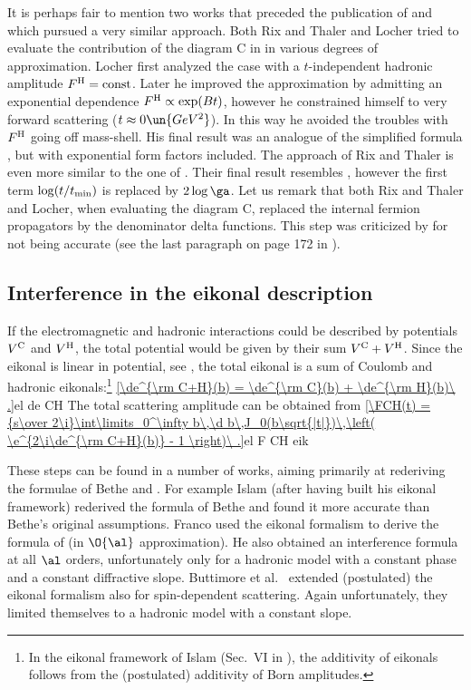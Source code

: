 It is perhaps fair to mention two works that preceded the publication of \WaY{}  and which pursued a very similar approach. Both Rix and Thaler  and Locher  tried to evaluate the contribution of the diagram C in  in various degrees of approximation. Locher first analyzed the case with a $t$-independent hadronic amplitude $F^{\rm H}=\hbox{const}$. Later he improved the approximation by admitting an exponential dependence $F^{\rm H} \propto \exp(Bt)$, however he constrained himself to very forward scattering ($t\approx 0\un{GeV^2}$). In this way he avoided the troubles with $F^{\rm H}$ going off mass-shell. His final result was an analogue of the simplified \WaY{} formula , but with exponential form factors included. The approach of Rix and Thaler is even more similar to the one of \WaY. Their final result resembles , however the first term $\log(t/t_{\rm min})$ is replaced by $2\log\ga$. Let us remark that both Rix and Thaler and Locher, when evaluating the diagram C, replaced the internal fermion propagators by the denominator delta functions. This step was criticized by \WaY{} for not being accurate (see the last paragraph on page 172 in ).



\subsection[int eik]{Interference in the eikonal description}

If the electromagnetic and hadronic interactions could be described by potentials $V^{\rm C}$ and $V^{\rm H}$, the total potential would be given by their sum $V^{\rm C} + V^{\rm H}$. Since the eikonal is linear in potential, see , the total eikonal is a sum of Coulomb and hadronic eikonals:\footnote{%
In the eikonal framework of Islam (Sec.~VI in ), the additivity of eikonals follows from the (postulated) additivity of Born amplitudes.
}
\eqref{\de^{\rm C+H}(b) = \de^{\rm C}(b) + \de^{\rm H}(b)\ .}{el de CH}
The total scattering amplitude can be obtained from 
\eqref{\FCH(t) = {s\over 2\i}\int\limits_0^\infty b\,\d b\,J_0(b\sqrt{|t|})\,\left( \e^{2\i\de^{\rm C+H}(b)} - 1 \right)\ .}{el F CH eik}

These steps can be found in a number of works, aiming primarily at rederiving the formulae of Bethe  and \WY{} .
  For example Islam  (after having built his eikonal framework) rederived the formula of Bethe and found it more accurate than Bethe's original assumptions.
  Franco  used the eikonal formalism to derive the formula of \WY{} (in $\O{\al}$ approximation). He also obtained an interference formula at all $\al$ orders, unfortunately only for a hadronic model with a constant phase and a constant diffractive slope.
  Buttimore et al.~ extended (postulated) the eikonal formalism also for spin-dependent scattering. Again unfortunately, they limited themselves to a hadronic model with a constant slope.

